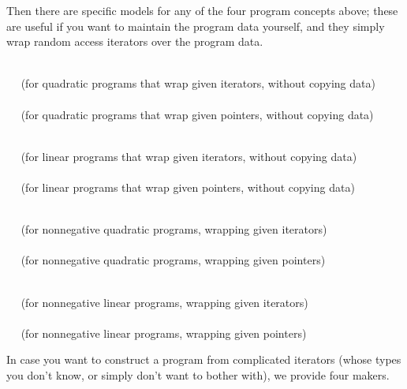 Then there are specific models for any of the four program concepts above; 
these are useful if you want to maintain the program data yourself, and
they simply wrap random access iterators over the program data. 

\\
$\quad$ (for quadratic programs that wrap given iterators, without copying 
data) \\
\\
$\quad$ (for quadratic programs that wrap given pointers, without copying 
data) 

\\
$\quad$ (for linear programs that wrap given iterators, without copying 
data) \\
\\
$\quad$ (for linear programs that wrap given pointers, without copying 
data) 

\\
$\quad$ (for nonnegative quadratic programs, wrapping given iterators)\\
\\
$\quad$ (for nonnegative quadratic programs, wrapping given pointers)

\\
$\quad$ (for nonnegative linear programs, wrapping given iterators)\\
\\
$\quad$ (for nonnegative linear programs, wrapping given pointers)


In case you want to construct a program from complicated iterators
(whose types you don't know, or simply don't want to bother with), 
we provide four makers.

\\
\\
\\

